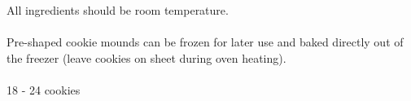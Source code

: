 \begin{recipe}
	\suggestion
	{
		All ingredients should be room temperature. \\ \\
		Pre-shaped cookie mounds can be frozen for later use and baked directly out of the freezer (leave cookies on sheet during oven heating). \\ \\
		18 - 24 cookies
	}


\end{recipe}
